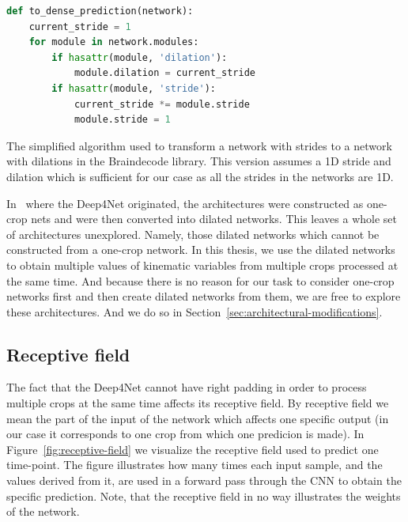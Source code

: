 \begin{algorithm}
\begin{lstlisting}[language=Python, label={lst:lstlisting}]
def to_dense_prediction(network):
	current_stride = 1
	for module in network.modules:
		if hasattr(module, 'dilation'):
			module.dilation = current_stride
		if hasattr(module, 'stride'):
			current_stride *= module.stride
			module.stride = 1
\end{lstlisting}
\caption{The simplified algorithm used to transform a network with strides to a network with dilations in the Braindecode library.
This version assumes a 1D stride and dilation which is sufficient for our case as all the strides in the networks are 1D.
}
\label{alg:stride-to-dilation}
\end{algorithm}


In~\cite{schirrmeister-deep-2017} where the Deep4Net originated, the architectures were constructed as one-crop nets and were then converted into dilated networks.
This leaves a whole set of architectures unexplored.
Namely, those dilated networks which cannot be constructed from a one-crop network.
In this thesis, we use the dilated networks to obtain multiple values of kinematic variables from multiple crops processed at the same time. 
And because there is no reason for our task to consider one-crop networks first and then create dilated networks from them, we are free to explore these architectures.
And we do so in Section~\ref{sec:architectural-modifications}.

\subsection{Receptive field}\label{subsec:receptive-field}
The fact that the Deep4Net cannot have right padding in order to process multiple crops at the same time affects its receptive field.
By receptive field we mean the part of the input of the network which affects one specific output (in our case it corresponds to one crop from which one predicion is made).
In Figure~\ref{fig:receptive-field} we visualize the receptive field used to predict one time-point.
The figure illustrates how many times each input sample, and the values derived from it, are used in a forward pass through the CNN to obtain the specific prediction.
Note, that the receptive field in no way illustrates the weights of the network.

